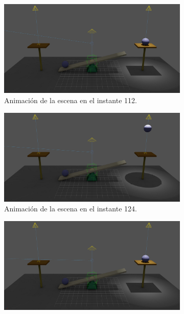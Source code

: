 \begin{figure}[H]\ContinuedFloat
   \begin{subfigure}[t]{0.48\textwidth}
      \centering
      \includegraphics[width=\textwidth]{imagenes/animaciones/general/112.jpg}
      \caption{Animación de la escena en el instante 112.}
   \end{subfigure}
   \hfill
   \begin{subfigure}[t]{0.48\textwidth}
      \centering
      \includegraphics[width=\textwidth]{imagenes/animaciones/general/124.jpg}
      \caption{Animación de la escena en el instante 124.}
   \end{subfigure}
   \par\bigskip
   \begin{subfigure}[t]{0.48\textwidth}
      \centering
      \includegraphics[width=\textwidth]{imagenes/animaciones/general/136.jpg}

\end{subfigure}
\end{figure}

